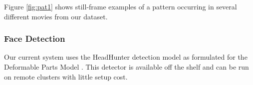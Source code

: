 Figure \ref{fig:pat1} shows still-frame examples of a pattern occurring in several different movies from our dataset. 
    

\subsubsection*{Face Detection}
Our current system uses the HeadHunter \cite{mathias_face_2014} detection model as formulated for the Deformable Parts Model \cite{lsvm-pami}. This detector is available off the shelf and can be run on remote clusters with little setup cost.


